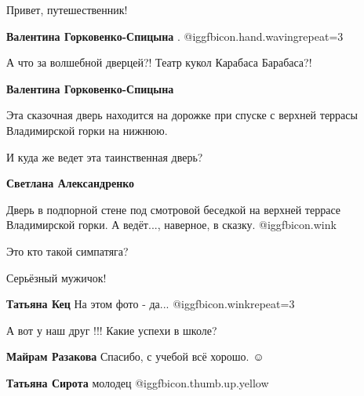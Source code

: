  
 
 
 
 

Привет, путешественник!

\textbf{Валентина Горковенко-Спицына} . @igg{fbicon.hand.waving}{repeat=3} 

А что за волшебной дверцей?! Театр кукол Карабаса Барабаса?!

\textbf{Валентина Горковенко-Спицына} 

Эта сказочная дверь находится на дорожке при спуске с верхней террасы
Владимирской горки на нижнюю.

И куда же ведет эта таинственная дверь?

\textbf{Светлана Александренко} 

Дверь в подпорной стене под смотровой беседкой на верхней террасе Владимирской
горки. А ведёт..., наверное, в сказку. @igg{fbicon.wink} 

Это кто такой симпатяга?

Серьёзный мужичок!

\textbf{Татьяна Кец} На этом фото - да... @igg{fbicon.wink}{repeat=3} 

А вот у наш друг !!! Какие успехи в школе?

\textbf{Майрам Разакова} Спасибо, с учебой всё хорошо. ☺ ️ 

\textbf{Татьяна Сирота} молодец @igg{fbicon.thumb.up.yellow} 

